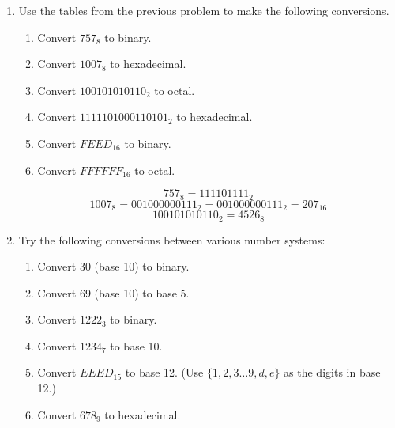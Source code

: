 \documentclass[10pt,]{book}
\theoremstyle{plain}
\theoremstyle{definition}
\theoremstyle{definition}
\numberwithin{equation}{section}
\newcommand{\hint}[1]{ }
\begin{document}
\begin{enumerate}[label=(\alph*)]
          \hint{



          This is just counting in binary. Remember the sanity check that the hexadecimal digit A is represented by 1010 in binary.  (\(10_{10} \; = \; A_{16} \; = \; 1010_{2}\))



          }
\item\hypertarget{li-54}{}
      Use the tables from the previous problem to make the following conversions.

\begin{enumerate}[label=\roman*.]
\item\hypertarget{li-55}{}
            Convert \(757_8\) to binary.
\item\hypertarget{li-56}{}
            Convert \(1007_8\) to hexadecimal.
\item\hypertarget{li-57}{}
            Convert \(100101010110_2\) to octal.
\item\hypertarget{li-58}{}
            Convert \(1111101000110101_2\) to hexadecimal.
\item\hypertarget{li-59}{}
            Convert \(FEED_{16}\) to binary.
\item\hypertarget{li-60}{}
            Convert \(FFFFFF_{16}\) to octal.
\end{enumerate}

\begin{equation*}
        757_8 = 111 101 111_2
      \end{equation*}\begin{equation*}
        1007_8 = 001 000 000 111_2 = 0010 0000 0111_2 = 207_{16}
      \end{equation*}\begin{equation*}
        100 101 010 110_2 = 4526_8
      \end{equation*}\item\hypertarget{li-61}{}
      Try the following conversions between various number systems:

\begin{enumerate}[label=\roman*.]
\item\hypertarget{li-62}{}
            Convert \(30\) (base 10) to binary.
\item\hypertarget{li-63}{}
            Convert \(69\) (base 10) to base 5.
\item\hypertarget{li-64}{}
            Convert \(1222_3\) to binary.
\item\hypertarget{li-65}{}
            Convert \(1234_7\) to base 10.
\item\hypertarget{li-66}{}
            Convert \(EEED_{15}\) to base 12. (Use \(\{1, 2, 3 \ldots 9, d, e\}\) as the digits in base 12.)
\item\hypertarget{li-67}{}
            Convert \(678_{9}\) to hexadecimal.
\end{enumerate}


\end{enumerate}
\end{document}
